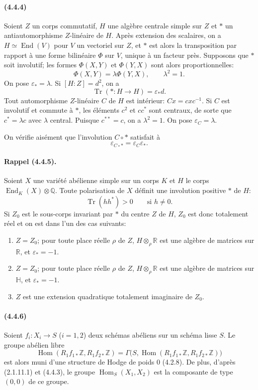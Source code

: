 \documentclass[10pt]{article}
\newcommand{\Q}{\mathbb Q}
\newcommand{\Z}{\mathbb Z}
\newcommand{\Hom}{\operatorname{Hom}}
\newcommand{\R}{\mathbb R}
\providecommand{\End}{\operatorname{End}}
\newcommand{\Tr}{\operatorname{Tr}}
\begin{document}
\paragraph{(4.4.4)} Soient $Z$ un corps commutatif, $H$ une algèbre centrale simple sur $Z$ et $*$ un antiautomorphisme $Z$-linéaire de $H$. Après extension des scalaires, on a $H\simeq\End(V)$ pour $V$ un vectoriel sur $Z$, et $*$ est alors la transposition par rapport à une forme bilinéaire $\Phi$ sur $V$, unique à un facteur près. Supposons que $*$ soit involutif; les formes $\Phi(X,Y)$ et $\Phi(Y,X)$ sont alors proportionnelles:
\[
\Phi(X,Y)=\lambda\Phi(Y,X),\qquad \lambda^2=1.
\]
On pose $\varepsilon_*=\lambda$. Si $[H:Z]=d^2$, on a
\[
\Tr(*:H\to H)=\varepsilon_* d.
\]
Tout automorphisme $Z$-linéaire $C$ de $H$ est intérieur: $Cx=cxc^{-1}$. Si $C$ est involutif et commute à $*$, les éléments $c^2$ et $cc^*$ sont centraux, de sorte que $c^*=\lambda c$ avec $\lambda$ central. Puisque $c^{**}=c$, on a $\lambda^2=1$. On pose $\varepsilon_C=\lambda$.

On vérifie aisément que l'involution $C\circ *$ satisfait à
\[
\varepsilon_{C\circ *}=\varepsilon_C\varepsilon_*.
\]

\paragraph{Rappel (4.4.5).} Soient $X$ une variété abélienne simple sur un corps $K$ et $H$ le corps $\End_K(X)\otimes\Q$. Toute polarisation de $X$ définit une involution positive $*$ de $H$:
\[
\Tr(hh^*)>0\qquad\text{si }h\ne0.
\]
Si $Z_0$ est le sous-corps invariant par $*$ du centre $Z$ de $H$, $Z_0$ est donc totalement réel et on est dans l'un des cas suivants:
\begin{enumerate}[label=\alph*)]
\item $Z=Z_0$; pour toute place réelle $\rho$ de $Z$, $H\otimes_\rho\R$ est une algèbre de matrices sur $\R$, et $\varepsilon_*=-1$.
\item $Z=Z_0$; pour toute place réelle $\rho$ de $Z$, $H\otimes_\rho\R$ est une algèbre de matrices sur $\mathbb H$, et $\varepsilon_*= -1$.
\item $Z$ est une extension quadratique totalement imaginaire de $Z_0$.
\end{enumerate}

\paragraph{(4.4.6)} Soient $f_i:X_i\to S$ ($i=1,2$) deux schémas abéliens sur un schéma lisse $S$. Le groupe abélien libre
\[
\Hom(R_1f_{1*}\Z,R_1f_{2*}\Z)
 =\Gamma\bigl(S,\Hom(R_1f_{1*}\Z,R_1f_{2*}\Z)\bigr)
\]
est alors muni d'une structure de Hodge de poids $0$ (4.2.8). De plus, d'après (2.1.11.1) et (4.4.3), le groupe $\Hom_S(X_1,X_2)$ est la composante de type $(0,0)$ de ce groupe.
\end{document}
